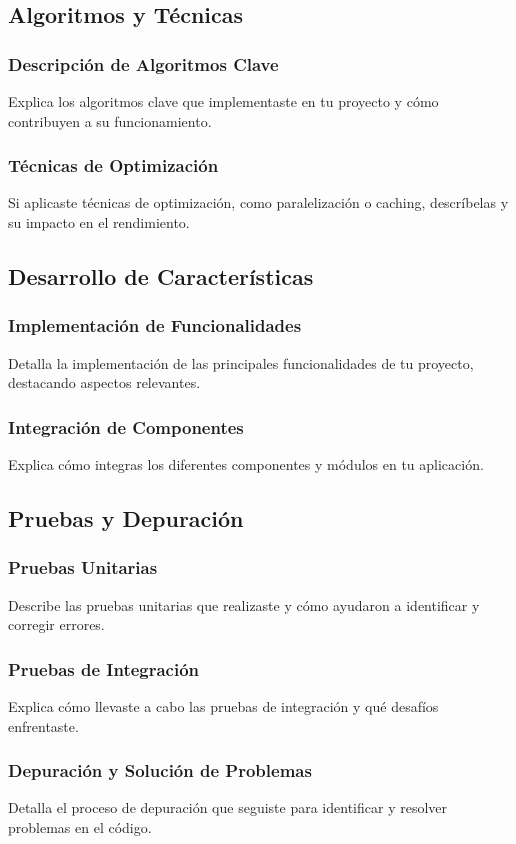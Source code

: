 \subsection{Algoritmos y Técnicas}

\subsubsection{Descripción de Algoritmos Clave}
Explica los algoritmos clave que implementaste en tu proyecto y cómo contribuyen a su funcionamiento.

\subsubsection{Técnicas de Optimización}
Si aplicaste técnicas de optimización, como paralelización o caching, descríbelas y su impacto en el rendimiento.

\subsection{Desarrollo de Características}

\subsubsection{Implementación de Funcionalidades}
Detalla la implementación de las principales funcionalidades de tu proyecto, destacando aspectos relevantes.

\subsubsection{Integración de Componentes}
Explica cómo integras los diferentes componentes y módulos en tu aplicación.

\subsection{Pruebas y Depuración}

\subsubsection{Pruebas Unitarias}
Describe las pruebas unitarias que realizaste y cómo ayudaron a identificar y corregir errores.

\subsubsection{Pruebas de Integración}
Explica cómo llevaste a cabo las pruebas de integración y qué desafíos enfrentaste.

\subsubsection{Depuración y Solución de Problemas}
Detalla el proceso de depuración que seguiste para identificar y resolver problemas en el código.

